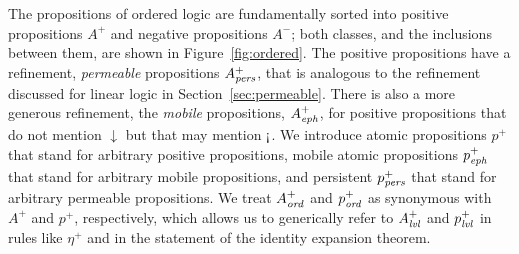 The propositions of ordered logic are fundamentally sorted into
positive propositions $A^+$ and negative propositions $A^-$; both
classes, and the inclusions between them, 
are shown in Figure~\ref{fig:ordered}. The
positive propositions have a refinement, {\it permeable} propositions
$A^+_{\it pers}$, that is analogous to the refinement discussed for linear
logic in Section~\ref{sec:permeable}. There is also a more generous
refinement, the {\it mobile} propositions, $A^+_{\it eph}$, for positive
propositions that do not mention ${\downarrow}$ but that may mention
${\gnab}$. We introduce atomic propositions $p^+$ that stand for
arbitrary positive propositions, mobile
atomic propositions $p^+_{\it eph}$ that stand for arbitrary
mobile propositions, and persistent $p^+_{\it pers}$ that stand for arbitrary
permeable propositions. We treat $A^+_{\it ord}$ and $p^+_{\it ord}$ as synonymous
with $A^+$ and $p^+$, respectively, which allows us to generically
refer to $A^+_{\it lvl}$ and $p^+_{\it lvl}$ in rules like $\eta^+$ and in the
statement of the identity expansion theorem.

